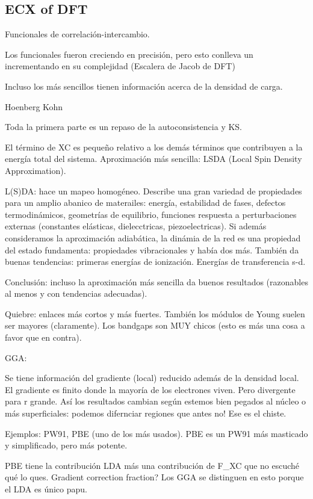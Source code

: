 \subsection{ECX of DFT}

  Funcionales de correlación-intercambio.

  Los funcionales fueron creciendo en precisión, pero esto conlleva un incrementando en su complejidad (Escalera de Jacob de DFT)

  Incluso los más sencillos tienen información acerca de la densidad de carga.

  Hoenberg Kohn

  Toda la primera parte es un repaso de la autoconsistencia y KS.

  El término de XC es pequeño relativo a los demás términos que contribuyen a la energía total del sistema. Aproximación más sencilla: LSDA (Local Spin Density Approximation).

  L(S)DA: hace un mapeo homogéneo. Describe una gran variedad de propiedades para un amplio abanico de materailes: energía, estabilidad de fases, defectos termodinámicos, geometrías de equilibrio, funciones respuesta a perturbaciones externas (constantes elásticas, dielecctricas, piezoelectricas). Si además consideramos la aproximación adiabática, la dinámia de la red es una propiedad del estado fundamenta: propiedades vibracionales y había dos más. También da buenas tendencias: primeras energías de ionización. Energías de transferencia s-d.

  Conclusión: incluso la aproximación más sencilla da buenos resultados (razonables al menos y con tendencias adecuadas).

  Quiebre: enlaces más cortos y más fuertes. También los módulos de Young suelen ser mayores (claramente). Los bandgaps son MUY chicos (esto es más una cosa a favor que en contra).



  GGA:

  Se tiene información del gradiente (local) reducido además de la densidad local. El gradiente es finito donde la mayoría de los electrones viven. Pero divergente para r grande. Así los resultados cambian según estemos bien pegados al núcleo o más superficiales: podemos difernciar regiones que antes no! Ese es el chiste.

  Ejemplos: PW91, PBE (uno de los más usados). PBE es un PW91 más masticado y simplificado, pero más potente.

  PBE tiene la contribución LDA más una contribución de F_{XC} que no escuché qué lo ques. Gradient correction fraction? Los GGA se distinguen en esto porque el LDA es único papu.

